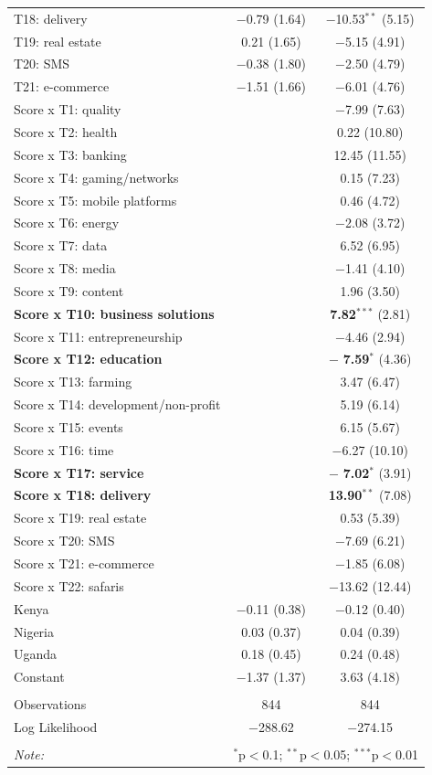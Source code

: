 \documentclass[12pt]{article}
\begin{document}
\begin{table}[!htbp]
\begin{tabular}{@{\extracolsep{5pt}}lcc}
  T18: delivery & $-$0.79 (1.64) & $-$10.53$^{**}$ (5.15) \\ 
  T19: real estate & 0.21 (1.65) & $-$5.15 (4.91) \\ 
  T20: SMS & $-$0.38 (1.80) & $-$2.50 (4.79) \\ 
  T21: e-commerce & $-$1.51 (1.66) & $-$6.01 (4.76) \\ 
  Score x T1: quality &  & $-$7.99 (7.63) \\ 
  Score x T2: health &  & 0.22 (10.80) \\ 
  Score x T3: banking &  & 12.45 (11.55) \\ 
  Score x T4: gaming/networks &  & 0.15 (7.23) \\ 
  Score x T5: mobile platforms &  & 0.46 (4.72) \\ 
  Score x T6: energy &  & $-$2.08 (3.72) \\ 
  Score x T7: data &  & 6.52 (6.95) \\ 
  Score x T8: media &  & $-$1.41 (4.10) \\ 
  Score x T9: content &  & 1.96 (3.50) \\ 
  \textbf{Score x T10: business solutions} &  & \textbf{7.82}$^{***}$ (2.81) \\ 
  Score x T11: entrepreneurship &  & $-$4.46 (2.94) \\ 
  \textbf{Score x T12: education} &  & $-$ \textbf{7.59}$^{*}$ (4.36) \\ 
  Score x T13: farming &  & 3.47 (6.47) \\ 
  Score x T14: development/non-profit &  & 5.19 (6.14) \\ 
  Score x T15: events &  & 6.15 (5.67) \\ 
  Score x T16: time &  & $-$6.27 (10.10) \\ 
  \textbf{Score x T17: service} &  & $-$ \textbf{7.02}$^{*}$ (3.91) \\ 
  \textbf{Score x T18: delivery} &  &  \textbf{13.90}$^{**}$ (7.08) \\ 
  Score x T19: real estate &  & 0.53 (5.39) \\ 
  Score x T20: SMS &  & $-$7.69 (6.21) \\ 
  Score x T21: e-commerce &  & $-$1.85 (6.08) \\ 
  Score x T22: safaris &  & $-$13.62 (12.44) \\ 
  Kenya & $-$0.11 (0.38) & $-$0.12 (0.40) \\ 
  Nigeria & 0.03 (0.37) & 0.04 (0.39) \\ 
  Uganda & 0.18 (0.45) & 0.24 (0.48) \\ 
  Constant & $-$1.37 (1.37) & 3.63 (4.18) \\ 
 \hline \\[-1.8ex] 
Observations & 844 & 844 \\ 
Log Likelihood & $-$288.62 & $-$274.15 \\ 
\hline 
\hline \\[-1.8ex] 
\textit{Note:}  & \multicolumn{2}{r}{$^{*}$p$<$0.1; $^{**}$p$<$0.05; $^{***}$p$<$0.01} \\ 
\end{tabular} 
\end{table} 
\end{document}
